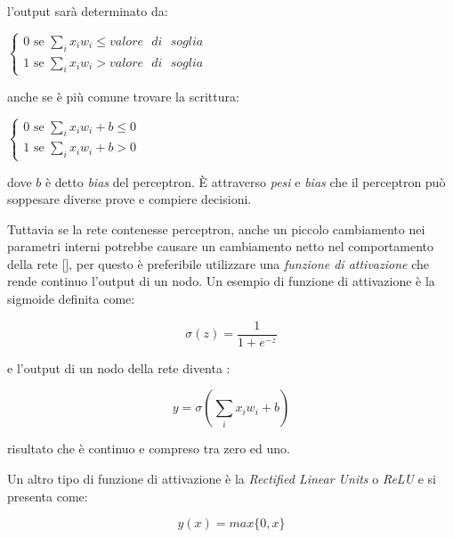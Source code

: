 \documentclass[12pt,a4paper]{report}
\begin{document}
l'output sarà determinato da:

\begin{center}
$\begin{cases}
 0 \text{ se } \sum_{i} x_{i}w_{i} \leq valore\text{ }di\text{ }soglia\\
 1 \text{ se } \sum_{i} x_{i}w_{i} > valore\text{ }di\text{ }soglia 
\end{cases} $
\end{center}

anche se è più comune trovare la scrittura:

\begin{center}
$\begin{cases}
 0 \text{ se } \sum_{i} x_{i}w_{i} + b \leq 0\\
 1 \text{ se } \sum_{i} x_{i}w_{i} + b > 0
\end{cases}$
\end{center}

dove $b$ è detto \textit{bias} del perceptron.
È attraverso \textit{pesi} e \textit{bias} che il perceptron può soppesare diverse prove e compiere decisioni.

Tuttavia se la rete contenesse perceptron, anche un piccolo cambiamento nei parametri interni potrebbe causare un cambiamento netto nel comportamento della rete [\cite{neural-net-nielsen}], per questo è preferibile utilizzare una \textit{funzione di attivazione} che rende continuo l'output di un nodo.
Un esempio di funzione di attivazione è la sigmoide definita come:

\begin{equation} \label{sigma}
 \sigma(z) = \frac{1}{1+e^{-z}} 
\end{equation}

e l'output di un nodo della rete diventa :

\begin{equation} \label{z}
  y = \sigma(\sum_{i}{x_{i}w_{i}} + b)
\end{equation}

risultato che è continuo e compreso tra zero ed uno.

Un altro tipo di funzione di attivazione è la \textit{Rectified Linear Units} o \textit{ReLU} e si presenta come:

\begin{equation}
 y(x) = max \{0,x\} 
\end{equation}
\end{document}
